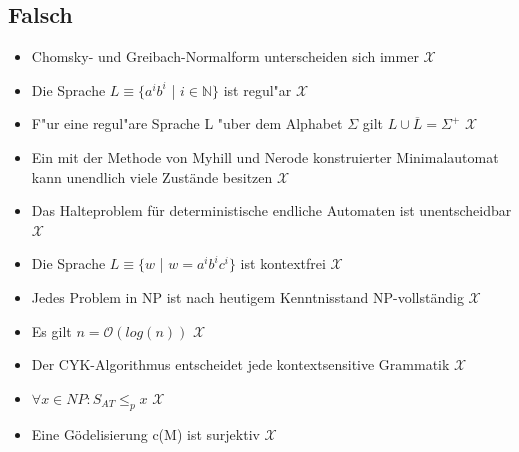 \documentclass[11pt, a4paper]{scrartcl}
\newcommand{\rd}[1]{{\color{Red}#1}}
\begin{document}
\subsection*{Falsch}
\begin{itemize}
    \item Chomsky- und Greibach-Normalform unterscheiden sich immer \rd{$\mathcal{X}$}
    \item Die Sprache $L \equiv \{a^ib^i$ | $i \in \mathbb{N}\}$ ist regul"ar \rd{$\mathcal{X}$}
    \item F"ur eine regul"are Sprache L "uber dem Alphabet $\Sigma$ gilt $L \cup \overline{L} = \Sigma^+$ \rd{$\mathcal{X}$}
    \item Ein mit der Methode von Myhill und Nerode konstruierter Minimalautomat kann unendlich viele Zustände besitzen \rd{$\mathcal{X}$}
    \item Das Halteproblem für deterministische endliche Automaten ist unentscheidbar \rd{$\mathcal{X}$}
    \item Die Sprache $L \equiv \{w$ | $w = a^ib^ic^i\}$ ist kontextfrei \rd{$\mathcal{X}$}
    \item Jedes Problem in NP ist nach heutigem Kenntnisstand NP-vollständig \rd{$\mathcal{X}$}
    \item Es gilt $n = \mathcal{O}(log(n))$ \rd{$\mathcal{X}$}
    \item Der CYK-Algorithmus entscheidet jede kontextsensitive Grammatik \rd{$\mathcal{X}$}
    \item $\forall x \in NP : S_{AT} \leq_p x$ \rd{$\mathcal{X}$}
    \item Eine Gödelisierung c(M) ist surjektiv \rd{$\mathcal{X}$}
\end{itemize}
\end{document}
